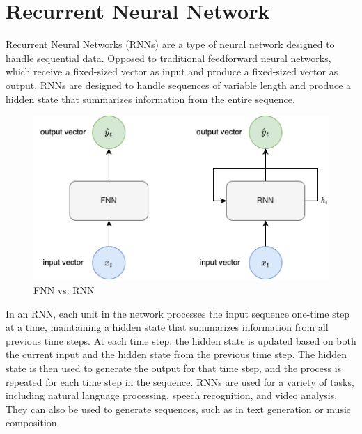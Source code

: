     \section{Recurrent Neural Network}
    \label{sec:rnn-background}

        Recurrent Neural Networks (RNNs) are a type of neural network designed to handle sequential data.
        Opposed to traditional feedforward neural networks, which receive a fixed-sized vector as input and produce a fixed-sized vector as output, 
        RNNs are designed to handle sequences of variable length and produce a hidden state that summarizes information from the entire sequence.
        \begin{figure}[h!]
            \centering
            \includegraphics[scale=0.5]{figures/FNN_vs_RNN.drawio.png}
            \caption{FNN vs. RNN}
            \label{fig:fnn-vs-rnn}
        \end{figure}
        In an RNN, each unit in the network processes the input sequence one-time step at a time, maintaining a hidden state that summarizes information from all previous time steps. At each time step, the hidden state is updated based on both the current input and the hidden state from the previous time step. The hidden state is then used to generate the output for that time step, and the process is repeated for each time step in the sequence.
        RNNs are used for a variety of tasks, including natural language processing, speech recognition, and video analysis. They can also be used to generate sequences, such as in text generation or music composition.


